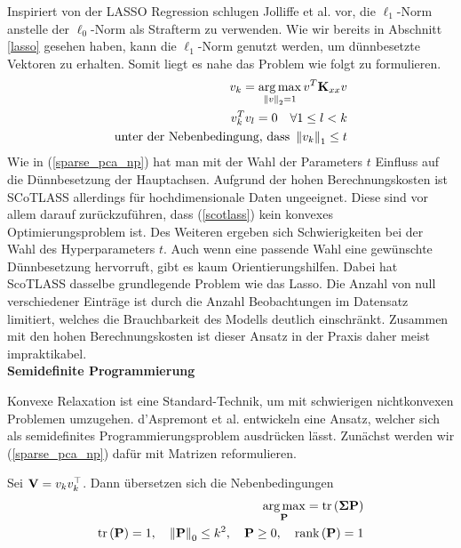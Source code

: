 Inspiriert von der LASSO Regression \cite{tibshirani_lasso} schlugen Jolliffe et al. \cite{scotlass} vor, die $\ell_1$-Norm anstelle der $\ell_0$-Norm als Strafterm zu verwenden. Wie wir bereits in Abschnitt \ref{lasso} gesehen haben, kann die $\ell_1$-Norm genutzt werden, um dünnbesetzte Vektoren zu erhalten. Somit liegt es nahe das Problem wie folgt zu formulieren.
\begin{gather}
\label{scotlass}
\begin{split}
v_{k} = \operatorname*{arg\,max}_{\left\lVert v \right\rVert_2 = 1} v^{T}\mathbf{K}_{xx} v\\
v_{k}^Tv_{l} = 0 \quad \forall 1 \leq l < k\\
{\text{unter der Nebenbedingung, dass }} \left\lVert v_{k} \right\rVert_1 \leq t
\end{split}
\end{gather}
Wie in (\ref{sparse_pca_np}) hat man mit der Wahl der Parameters $t$ Einfluss auf die Dünnbesetzung der Hauptachsen. Aufgrund der hohen Berechnungskosten ist SCoTLASS allerdings für hochdimensionale Daten ungeeignet. Diese sind vor allem darauf zurückzuführen, dass (\ref{scotlass}) kein konvexes Optimierungsproblem ist. Des Weiteren ergeben sich Schwierigkeiten bei der Wahl des Hyperparameters $t$. Auch wenn eine passende Wahl eine gewünschte Dünnbesetzung hervorruft, gibt es kaum Orientierungshilfen. Dabei hat ScoTLASS dasselbe grundlegende Problem wie das Lasso. Die Anzahl von null verschiedener Einträge ist durch die Anzahl Beobachtungen im Datensatz limitiert, welches die Brauchbarkeit des Modells deutlich einschränkt. Zusammen mit den hohen Berechnungskosten ist dieser Ansatz in der Praxis daher meist impraktikabel.\\

\textbf{Semidefinite Programmierung}

Konvexe Relaxation ist eine Standard-Technik, um mit schwierigen nichtkonvexen Problemen umzugehen. d'Aspremont et al. \cite{daspremont_semidefinite} entwickeln eine Ansatz, welcher sich als semidefinites Programmierungsproblem ausdrücken lässt. Zunächst werden wir (\ref{sparse_pca_np}) dafür mit Matrizen reformulieren.

Sei $\mathbf{V} = v_kv_k^{\top}$. Dann übersetzen sich die Nebenbedingungen 
\begin{align}
\label{semidefinite_programming_naive}
\begin{split}
\operatorname*{arg\,max}_{\mathbf{P}} = \text{tr} \left( \mathbf{\Sigma}\mathbf{P} \right)\\
\text{tr} \left( \mathbf{P} \right) = 1, \quad \left\lVert \mathbf{P} \right\rVert_0 \leq k^2, \quad \mathbf{P} \geq 0, \quad \text{rank} \left( \mathbf{P} \right) = 1
\end{split}
\end{align}

